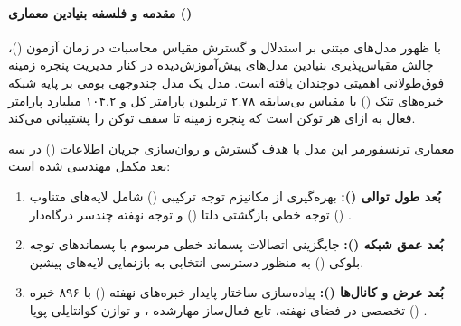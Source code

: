 \item {}

\paragraph*{مقدمه و فلسفه بنیادین معماری ()}
با ظهور مدل‌های مبتنی بر استدلال و گسترش مقیاس محاسبات در زمان آزمون ()، چالش مقیاس‌پذیری بنیادین مدل‌های پیش‌آموزش‌دیده در کنار مدیریت پنجره زمینه فوق‌طولانی اهمیتی دوچندان یافته است. مدل  \cite{kimi2026k3} یک مدل چندوجهی بومی بر پایه شبکه خبره‌های تنک () با مقیاس بی‌سابقه ۲.۷۸ تریلیون پارامتر کل و ۱۰۴.۲ میلیارد پارامتر فعال به ازای هر توکن است که پنجره زمینه تا سقف  توکن را پشتیبانی می‌کند. 

معماری ترنسفورمر این مدل با هدف گسترش و روان‌سازی جریان اطلاعات () در سه بعد مکمل مهندسی شده است:
\begin{enumerate}
    \item \textbf{بُعد طول توالی ():} بهره‌گیری از مکانیزم توجه ترکیبی () شامل لایه‌های متناوب توجه خطی بازگشتی دلتا () \cite{kimi2025linear} و توجه نهفته چندسر درگاه‌دار () \cite{deepseek2024v2, qiu2025gated}.
    \item \textbf{بُعد عمق شبکه ():} جایگزینی اتصالات پسماند خطی مرسوم با پسماندهای توجه بلوکی () \cite{kimi2026attnres} به منظور دسترسی انتخابی به بازنمایی لایه‌های پیشین.
    \item \textbf{بُعد عرض و کانال‌ها ():} پیاده‌سازی ساختار پایدار خبره‌های نهفته () \cite{elango2026latentmoe} با ۸۹۶ خبره تخصصی در فضای نهفته، تابع فعال‌ساز مهارشده ، و توازن کوانتایلی پویا () \cite{su2026travelsmoe}.
\end{enumerate}

